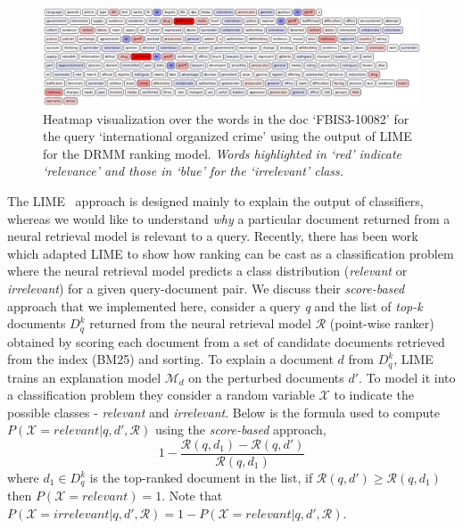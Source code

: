 \begin{figure}[]
  \centering
  \includegraphics[width=\textwidth]{Figures/q301_FBIS3-10082_lime_drmm.png}
  \caption[Heatmap visualization of document using LIME relevance weights for DRMM.]{Heatmap visualization over the words in the doc `\textsf{FBIS3-10082}' for the query `\textsf{international organized crime}' using the output of LIME for the DRMM ranking model. \textit{Words highlighted in `red' indicate `relevance' and those in `blue' for the `irrelevant' class.}}
  \label{fig:drmm_lime_heatmap}
\end{figure}

The LIME~\citep{Ribeiro16} approach is designed mainly to explain the output of classifiers, whereas we would like to understand \textit{why} a particular document returned from a neural retrieval model is relevant to a query. Recently, there has been work~\citep{Singh19} which adapted LIME to show how ranking can be cast as a classification problem where the neural retrieval model predicts a class distribution (\textit{relevant} or \textit{irrelevant}) for a given query-document pair. We discuss their {\it score-based} approach that we implemented here, consider a query {\it q} and the list of {\it top-k} documents $D^{k}_{q}$ returned from the neural retrieval model $\mathcal{R}$ (point-wise ranker) obtained by scoring each document from a set of candidate documents retrieved from the index (BM25) and sorting. To explain a document $d$ from $D^{k}_{q}$, LIME trains an explanation model $\mathcal{M}_{d}$ on the perturbed documents $d'$. To model it into a classification problem they consider a random variable $\mathcal{X}$ to indicate the possible classes - \textit{relevant} and \textit{irrelevant}. Below is the formula used to compute $P(\mathcal{X} = relevant|q,d',\mathcal{R})$ using the {\it score-based} approach,
\begin{equation}
    1 - \frac{\mathcal{R}(q,d_{1}) - \mathcal{R}(q,d')}{\mathcal{R}(q,d_{1})}
\end{equation}
where $d_{1} \in D^{k}_{q}$ is the top-ranked document in the list, if $\mathcal{R}(q,d') \geq \mathcal{R}(q,d_{1})$ then $P(\mathcal{X}=relevant) = 1$. Note that $P(\mathcal{X} = irrelevant|q,d',\mathcal{R}) = 1 - P(\mathcal{X} = relevant|q,d',\mathcal{R})$.


